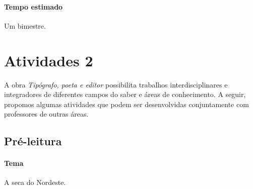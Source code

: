 \documentclass[12pt]{extarticle}
\begin{document}
\paragraph{Tempo estimado} Um bimestre.


\section{Atividades 2}



A obra \emph{Tipógrafo, poeta e editor} possibilita trabalhos
interdisciplinares e integradores de diferentes campos do saber e áreas
de conhecimento. A seguir, propomos algumas atividades que podem ser
desenvolvidas conjuntamente com professores de outras áreas.

\subsection{Pré-leitura}

\paragraph{Tema} A seca do Nordeste.
\end{document}
